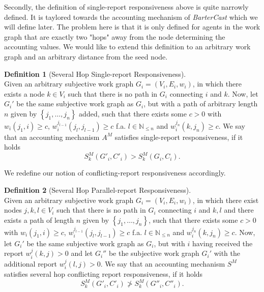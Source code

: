\documentclass[11pt,a4paper]{article}
\theoremstyle{definition}
\newtheorem{definition}{Definition}[section]
\theoremstyle{theorem}
\theoremstyle{proposition}
\theoremstyle{corollary}
\theoremstyle{lemma}
\theoremstyle{example}
\theoremstyle{remark}
\begin{document}
\noindent{}Secondly, the definition of single-report responsiveness above is quite narrowly defined. It is taylored towards the accounting mechanism of {\it BarterCast} which we will define later. The problem here is that it is only defined for agents in the work graph that are exactly two "hops" away from the node determining the accounting values. We would like to extend this definition to an arbitrary work graph and an arbitrary distance from the seed node. \vspace{1em}\\

\begin{definition}[Several Hop Single-report Responsiveness]\ \\
Given an arbitrary subjective work graph $G_i=(V_i,E_i,w_i)$, in which there exists a node $k\in{}V_i$ such that there is no path in $G_i$ connecting $i$ and $k$. Now, let $G_i'$ be the same subjective work graph as $G_i$, but with a path of arbitrary length $n$ given by $\left\lbrace{}j_1,\ldots,j_n\right\rbrace$ added, such that there exists some $c>0$ with $w_i(j_1,i)\geq{}c$, $w_i^{j_{l-1}}(j_l,j_{l-1})\geq{}c$ f.a. $l\in\mathbb{N}_{\leq{}n}$ and $w_i^{j_n}(k,j_n)\geq{}c$. We say that an accounting mechanism $A^M$ satisfies single-report responsiveness, if it holds
\[
S^M_k(G'_i,C'_i)>S^M_k(G_i,C_i).
\]
\end{definition}

\noindent{}We redefine our notion of conflicting-report responsiveness accordingly.\vspace{1em}\\

\begin{definition}[Several Hop Parallel-report Responsiveness]\ \\
Given an arbitrary subjective work graph $G_i=(V_i,E_i,w_i)$, in which there exist nodes $j,k,l\in{}V_i$ such that there is no path in $G_i$ connecting $i$ and $k,l$ and there exists a path of length $n$ given by $\left\lbrace{}j_1,\ldots,j_n\right\rbrace$, such that there exists some $c>0$ with $w_i(j_1,i)\geq{}c$, $w_i^{j_{l-1}}(j_l,j_{l-1})\geq{}c$ f.a. $l\in\mathbb{N}_{\leq{}n}$ and $w_i^{j_n}(k,j_n)\geq{}c$. Now, let $G_i'$ be the same subjective work graph as $G_i$, but with $i$ having received the report $w_i^j(k,j)>0$ and let $G_i''$ be the subjective work graph $G_i'$ with the additional report $w_i^j(l,j)>0$. We say that an accounting mechanism $S^M$ satisfies several hop conflicting report responsiveness, if it holds
\[
S^M_k(G'_i,C'_i)\not > S^M_k(G''_i,C''_i).
\]
\end{definition}
\end{document}
